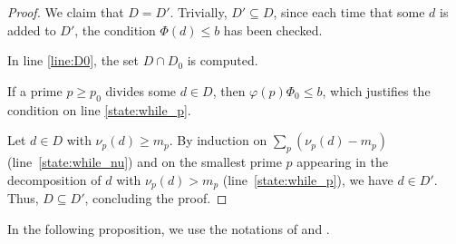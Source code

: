 \documentclass[a4paper]{amsart}
\newenvironment{myalgorithm}{\captionsetup{type=algType}}{}
\theoremstyle{definition}
\theoremstyle{plain}
\begin{document}
\begin{proof}
    \begin{myalgorithm}\caption{Determinant bounds}\label{alg:compute_D}
    \end{myalgorithm}
    
    We claim that \(D = D'\). Trivially, \(D' \subseteq D\), since each time that some \(d\) is added to \(D'\), the condition \(\Phi(d) \leq b\) has been checked. 
    
    In line \ref{line:D0}, the set \(D \cap D_0\) is computed. 

    If a prime \(p \geq p_0\) divides some \(d \in D\), then \(\varphi(p)\Phi_0 \leq b\), which justifies the condition on line \ref{state:while_p}. 
    
    Let \(d \in D\) with \(\nu_p(d) \geq m_p\). By induction on \(\sum_p (\nu_p(d) - m_p)\)
    (line~\ref{state:while_nu}) and on the smallest prime \(p\) appearing in the decomposition of \(d\) with \(\nu_p(d) > m_p\) (line~\ref{state:while_p}), we have \(d \in D'\). Thus, \(D \subseteq D'\), concluding the proof.
\end{proof}


In the following proposition, we use the notations of  and .
\end{document}
